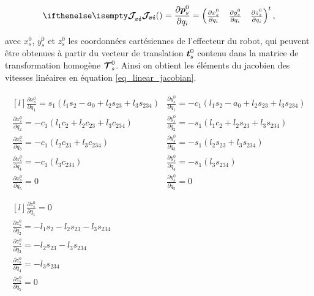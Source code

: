 \begin{appendices}
	\begin{equation}
		\jacobian{}{vi}{} = \frac{\partial \vect{p}^0_s}{\partial q_i} = 
		\begin{pmatrix}
			\frac{\partial x_s^0}{\partial q_i} & \frac{\partial y_s^0}{\partial q_i} & \frac{\partial z_s^0}{\partial q_i} 
		\end{pmatrix}^t,
	\end{equation}

	avec $ x^0_s $, $ y^0_s $ et $ z^0_s $ les coordonnées cartésiennes de l'effecteur du robot, qui peuvent être obtenues à partir du vecteur de translation $ \vect{t}^0_s $ contenu dans la matrice de transformation homogène $ \matrCal{T}^0_s $. Ainsi on obtient les éléments du jacobien des vitesses linéaires en équation \cref{eq_linear_jacobian}.
	
	\begin{equation} \label{eq_linear_jacobian}
		\begin{matrix}
		\begin{matrix*}[l]
			\frac{\partial x_s^0}{\partial q_1} = s_1 (l_1 s_2 - a_0 + l_2 s_{23} + l_3 s_{234}) & 
			\frac{\partial y_s^0}{\partial q_1} = -c_1 (l_1 s_{2} - a_0 + l_2 s_{23} + l_3 s_{234}) \\
			\frac{\partial x_s^0}{\partial q_2} = -c_1 (l_1 c_2 + l_2 c_{23} + l_3 c_{234}) &
			\frac{\partial y_s^0}{\partial q_2} = -s_1 (l_1 c_{2} + l_2 s_{23} + l_3 s_{234}) \\
			\frac{\partial x_s^0}{\partial q_3} = -c_1 (l_2 c_{23} + l_3 c_{234}) &
			\frac{\partial y_s^0}{\partial q_3} = -s_1 (l_2 s_{23} + l_3 s_{234}) \\
			\frac{\partial x_s^0}{\partial q_4} = -c_1 (l_3 c_{234}) &
			\frac{\partial y_s^0}{\partial q_4} = -s_1 (l_3 s_{234}) \\
			\frac{\partial x_s^0}{\partial q_5} = 0 &
			\frac{\partial y_s^0}{\partial q_5} = 0 \\
		\end{matrix*} \\
		\begin{matrix*}[l]
			\frac{\partial z_s^0}{\partial q_1} = 0 \\
			\frac{\partial z_s^0}{\partial q_2} = -l_1 s_2 - l_2 s_{23} - l_3 s_{234} \\
			\frac{\partial z_s^0}{\partial q_3} = -l_2 s_{23} - l_3 s_{234} \\
			\frac{\partial z_s^0}{\partial q_4} = -l_3 s_{234} \\
			\frac{\partial z_s^0}{\partial q_5} = 0 \\
		\end{matrix*}
		\end{matrix}
	\end{equation}


\end{appendices}

